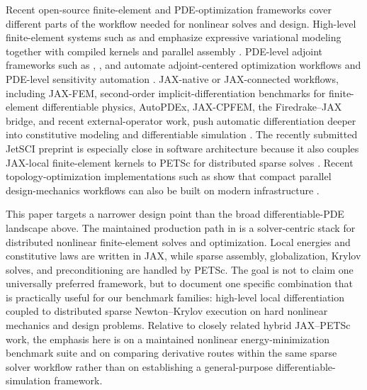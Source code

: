 Recent open-source finite-element and PDE-optimization frameworks cover
different parts of the workflow needed for nonlinear solves and design. High-level
finite-element systems such as \fenics{} and  emphasize expressive
variational modeling together with compiled kernels and parallel assembly
\citep{logg2012fenicsbook,baratta2025dolfinx}. PDE-level adjoint frameworks
such as , , and  automate
adjoint-centered optimization workflows and PDE-level sensitivity automation
\citep{farrell2013dolfinadjoint,mitusch2019pyadjoint,blauth2023cashocsv2}.
JAX-native or JAX-connected workflows, including JAX-FEM, second-order
implicit-differentiation benchmarks for finite-element differentiable physics,
AutoPDEx, JAX-CPFEM, the Firedrake--JAX bridge, and recent 
external-operator work, push automatic differentiation deeper into constitutive
modeling and differentiable simulation
\citep{xue2023jaxfem,xue2026implicit,bode2025autopdex,hu2025jaxcpfem,yashchuk2023bringing,latyshev2025externaloperators}.
The recently submitted JetSCI preprint is especially close in software
architecture because it also couples JAX-local finite-element kernels to PETSc
for distributed sparse solves \citep{cattaneo2026jetsci}.
Recent topology-optimization implementations such as  show that
compact parallel design-mechanics workflows can also be built on modern
 infrastructure \citep{jia2024fenitop}.

This paper targets a narrower design point than the broad differentiable-PDE
landscape above. The maintained production path in \repo{} is a solver-centric
\jaxpetsc{} stack for distributed nonlinear finite-element solves and optimization.
Local energies and constitutive laws are written in JAX, while sparse assembly,
globalization, Krylov solves, and preconditioning are handled by PETSc. The goal
is not to claim one universally preferred framework, but to document one specific
combination that is practically useful for our benchmark families: high-level
local differentiation coupled to distributed sparse Newton--Krylov execution on
hard nonlinear mechanics and design problems. Relative to closely related hybrid
JAX--PETSc work, the emphasis here is on a maintained nonlinear
energy-minimization benchmark suite and on comparing derivative routes within
the same sparse solver workflow rather than on establishing a general-purpose
differentiable-simulation framework.

